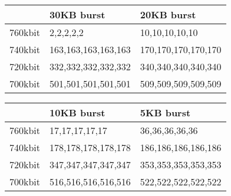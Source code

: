 \documentclass[a4paper,9pt]{beamer}
\begin{document}
{\begin{table}[htbp]
\label{table:alarms}
\centering
  \begin{tabular}{|l|l|l|}
\hline
	&	30KB burst 	&  20KB burst	\\%
\hline
760kbit	&      2,2,2,2,2   &      10,10,10,10,10\\%
\hline
740kbit &    163,163,163,163,163 & 170,170,170,170,170\\%
\hline
720kbit &    332,332,332,332,332 & 340,340,340,340,340\\%
\hline
700kbit &     501,501,501,501,501&  509,509,509,509,509\\%
    \hline
  \end{tabular}
  \begin{tabular}{|l|l|l|}
\hline
	&	       10KB burst 	&   \cellcolor{green} 5KB burst\\%
\hline
\cellcolor{green} 760kbit	&       17,17,17,17,17 & \cellcolor {yellow} 36,36,36,36,36\\%
\hline
740kbit &     178,178,178,178,178 &186,186,186,186,186\\%
\hline
720kbit &    347,347,347,347,347&  353,353,353,353,353 \\%
\hline
\cellcolor{green} 700kbit &       516,516,516,516,516 & \cellcolor {yellow} 522,522,522,522,522 \\%
\hline
  \end{tabular}
\end{table}
}
\end{document}
